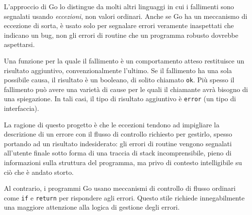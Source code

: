 L'approccio di Go lo distingue da molti altri linguaggi in cui i fallimenti sono segnalati usando \textit{eccezioni}, non valori ordinari.
Anche se Go ha un meccanismo di eccezione di sorta, è usato solo per segnalare errori veramente inaspettati che indicano un bug, non gli errori di routine che un programma robusto dovrebbe aspettarsi.

Una funzione per la quale il fallimento è un comportamento atteso restituisce un risultato aggiuntivo, convenzionalmente l'ultimo.
Se il fallimento ha una sola possibile causa, il risultato è un booleano, di solito chiamato \verb|ok|.
Più spesso il fallimento può avere una varietà di cause per le quali il chiamante avrà bisogno di una spiegazione.
In tali casi, il tipo di risultato aggiuntivo è \verb|error| (un tipo di interfaccia).

La ragione di questo progetto è che le eccezioni tendono ad impigliare la descrizione di un errore con il flusso di controllo richiesto per gestirlo, spesso portando ad un risultato indesiderato: gli errori di routine vengono segnalati all'utente finale sotto forma di una traccia di stack incomprensibile, pieno di informazioni sulla struttura del programma, ma privo di contesto intelligibile su ciò che è andato storto.

Al contrario, i programmi Go usano meccanismi di controllo di flusso ordinari come \verb|if| e \verb|return| per rispondere agli errori.
Questo stile richiede innegabilmente una maggiore attenzione alla logica di gestione degli errori.